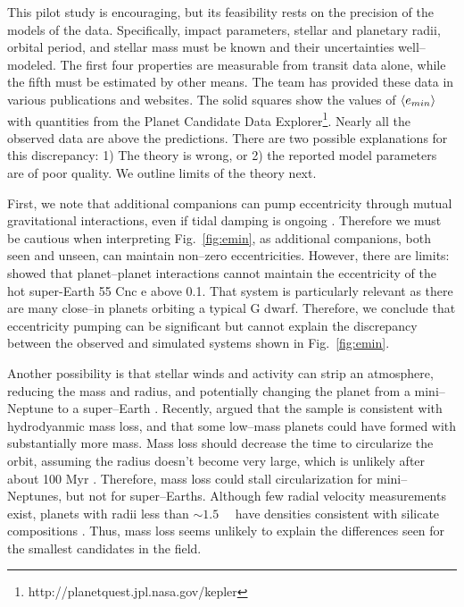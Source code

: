 This pilot study is encouraging, but its feasibility rests on the
precision of the models of the \kepler data.  Specifically, impact
parameters, stellar and planetary radii, orbital period, and stellar
mass must be known and their uncertainties well--modeled.  The first
four properties are measurable from transit data alone, while the
fifth must be estimated by other means.  The \kepler team has provided
these data in various publications and websites.  The solid squares
show the values of $\left< e_{min} \right>$ with quantities from the
\kepler Planet Candidate Data
Explorer\footnote{http://planetquest.jpl.nasa.gov/kepler}.  Nearly all
the observed data are above the predictions. There are two possible
explanations for this discrepancy: 1) The theory is wrong, or 2) the
reported model parameters are of poor quality.  We outline limits of
the theory next.

\medskip
{\centerline{}}
\smallskip

First, we note that additional companions can pump eccentricity
through mutual gravitational interactions, even if tidal damping is
ongoing \citep{MardlingLin02,Bolmont13}.  Therefore we must be
cautious when interpreting Fig.~\ref{fig:emin}, as additional
companions, both seen and unseen, can maintain non--zero
eccentricities.  However, there are limits: \cite{Bolmont13} showed
that planet--planet interactions cannot maintain the eccentricity of
the hot super-Earth 55 Cnc e above 0.1.  That system is particularly
relevant as there are many close--in planets orbiting a typical G
dwarf.  Therefore, we conclude that eccentricity pumping can be
significant but cannot explain the discrepancy between the observed
and simulated systems shown in Fig.~\ref{fig:emin}.

Another possibility is that stellar winds and activity can strip an
atmosphere, reducing the mass and radius, and potentially changing the
planet from a mini--Neptune to a super--Earth
\citep{Jackson10,Valencia10,Leitzinger11,Poppenhaeger12}.  Recently,
\cite{OwenWu13} argued that the \kepler sample is consistent with
hydrodyanmic mass loss, and that some low--mass planets could have
formed with substantially more mass.  Mass loss should decrease the
time to circularize the orbit, assuming the radius doesn't become very
large, which is unlikely after about 100 Myr \citep{Lopez12}.
Therefore, mass loss could stall circularization for mini--Neptunes,
but not for super--Earths.  Although few radial velocity measurements
exist, planets with radii less than $\sim 1.5$~\rearth~ have densities
consistent with silicate compositions \citep{Batalha11}.  Thus, mass
loss seems unlikely to explain the differences seen for the smallest
candidates in the \kepler field.

